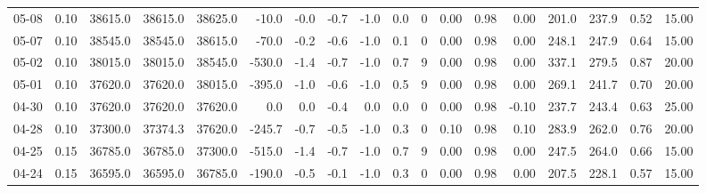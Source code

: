 \begin{threeparttable}
{\begin{tabular}{lrrrrrrrrrrrrrrrrr}
  05-08 &     0.10 & 38615.0 & 38615.0 & 38625.0 &      -10.0 &           -0.0 &                      -0.7 &                     -1.0 &                 0.0 &              0 &       0.00 &      0.98 &           0.00 &            201.0 &               237.9 &            0.52 &                  15.00 \\
  05-07 &     0.10 & 38545.0 & 38545.0 & 38615.0 &      -70.0 &           -0.2 &                      -0.6 &                     -1.0 &                 0.1 &              0 &       0.00 &      0.98 &           0.00 &            248.1 &               247.9 &            0.64 &                  15.00 \\
  05-02 &     0.10 & 38015.0 & 38015.0 & 38545.0 &     -530.0 &           -1.4 &                      -0.7 &                     -1.0 &                 0.7 &              9 &       0.00 &      0.98 &           0.00 &            337.1 &               279.5 &            0.87 &                  20.00 \\
  05-01 &     0.10 & 37620.0 & 37620.0 & 38015.0 &     -395.0 &           -1.0 &                      -0.6 &                     -1.0 &                 0.5 &              9 &       0.00 &      0.98 &           0.00 &            269.1 &               241.7 &            0.70 &                  20.00 \\
  04-30 &     0.10 & 37620.0 & 37620.0 & 37620.0 &        0.0 &            0.0 &                      -0.4 &                      0.0 &                 0.0 &              0 &       0.00 &      0.98 &          -0.10 &            237.7 &               243.4 &            0.63 &                  25.00 \\
  04-28 &     0.10 & 37300.0 & 37374.3 & 37620.0 &     -245.7 &           -0.7 &                      -0.5 &                     -1.0 &                 0.3 &              0 &       0.10 &      0.98 &           0.10 &            283.9 &               262.0 &            0.76 &                  20.00 \\
  04-25 &     0.15 & 36785.0 & 36785.0 & 37300.0 &     -515.0 &           -1.4 &                      -0.7 &                     -1.0 &                 0.7 &              9 &       0.00 &      0.98 &           0.00 &            247.5 &               264.0 &            0.66 &                  15.00 \\
  04-24 &     0.15 & 36595.0 & 36595.0 & 36785.0 &     -190.0 &           -0.5 &                      -0.1 &                     -1.0 &                 0.3 &              0 &       0.00 &      0.98 &           0.00 &            207.5 &               228.1 &            0.57 &                  15.00 \\

\end{tabular}}
\end{threeparttable}
